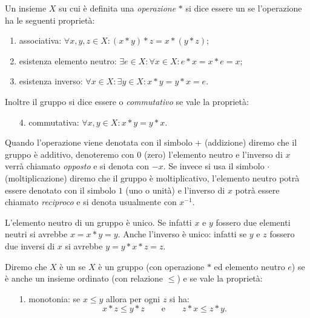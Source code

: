 \begin{definition}[gruppo]
  Un insieme $X$ su cui è definita una \emph{operazione} $*$ 
  si dice essere un  se l'operazione
  ha le seguenti proprietà:
  \begin{enumerate}
    \item associativa: $\forall x,y,z\in X\colon (x*y)*z = x*(y*z)$;
    \item esistenza elemento neutro: 
    $\exists e\in X\colon \forall x\in X \colon e*x=x*e = x$;
    \item esistenza inverso: 
    $\forall x\in X\colon \exists y\in X\colon x*y=y*x=e$.
  \end{enumerate}
  Inoltre il gruppo si dice essere  o \emph{commutativo}
  se vale la proprietà:
  \begin{enumerate}
    \item[4.] commutativa: $\forall x,y\in X\colon x*y = y*x$.
  \end{enumerate}
  
  Quando l'operazione viene denotata con il simbolo $+$ (addizione)
  diremo che il gruppo è additivo, denoteremo con $0$ 
  (zero) l'elemento neutro e l'inverso di $x$ verrà chiamato \emph{opposto}
  e si denota con $-x$.
  Se invece si usa il simbolo $\cdot$ (moltiplicazione)
  diremo che il gruppo è moltiplicativo, l'elemento neutro potrà 
  essere denotato con il simbolo $1$ (uno o unità) e 
  l'inverso di $x$ potrà essere chiamato \emph{reciproco}
  e si denota usualmente con $x^{-1}$.
  \end{definition}
  
  L'elemento neutro di un gruppo è unico. 
  Se infatti $x$ e $y$ fossero due elementi neutri 
  si avrebbe $x = x*y = y$. 
  Anche l'inverso è unico: infatti se $y$ e $z$ fossero 
  due inversi di $x$ si avrebbe $y = y * x * z = z$.
  
  \begin{definition}
    Diremo che $X$ è un  se $X$ è un gruppo
    (con operazione $*$ ed elemento neutro $e$) 
    se è anche un insieme ordinato (con relazione $\le$)
    e se vale la proprietà:
    \begin{enumerate}
      \item[1.] monotonia: se $x\le y$ allora per ogni $z$ si ha:
       \[
       x*z \le y*z \qquad\text{e}\qquad z*x \le z*y.
       \] 
    \end{enumerate}
  \end{definition}
  
